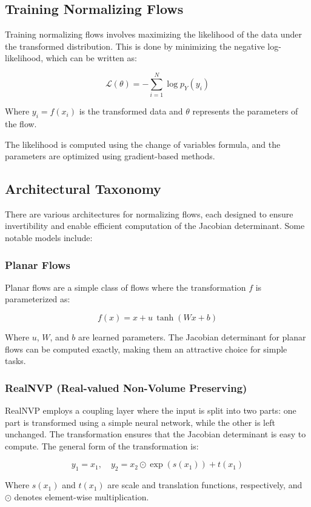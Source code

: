 \documentclass{article}
\begin{document}
\subsection{Training Normalizing Flows}
Training normalizing flows involves maximizing the likelihood of the data under the transformed distribution. This is done by minimizing the negative log-likelihood, which can be written as:

\[
\mathcal{L}(\theta) = -\sum_{i=1}^N \log p_Y(y_i)
\]

Where \( y_i = f(x_i) \) is the transformed data and \( \theta \) represents the parameters of the flow.

The likelihood is computed using the change of variables formula, and the parameters are optimized using gradient-based methods.

\subsection{Architectural Taxonomy}
There are various architectures for normalizing flows, each designed to ensure invertibility and enable efficient computation of the Jacobian determinant. Some notable models include:

\subsubsection{Planar Flows}
Planar flows are a simple class of flows where the transformation \( f \) is parameterized as:

\[
f(x) = x + u \, \tanh(Wx + b)
\]

Where \( u \), \( W \), and \( b \) are learned parameters. The Jacobian determinant for planar flows can be computed exactly, making them an attractive choice for simple tasks.

\subsubsection{RealNVP (Real-valued Non-Volume Preserving)}
RealNVP employs a coupling layer where the input is split into two parts: one part is transformed using a simple neural network, while the other is left unchanged. The transformation ensures that the Jacobian determinant is easy to compute. The general form of the transformation is:

\[
y_1 = x_1, \quad y_2 = x_2 \odot \exp(s(x_1)) + t(x_1)
\]

Where \( s(x_1) \) and \( t(x_1) \) are scale and translation functions, respectively, and \( \odot \) denotes element-wise multiplication.
\end{document}
